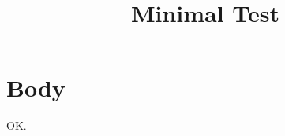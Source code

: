 \documentclass{SUSTechHomework}
\title{Minimal Test}
\begin{document}
\maketitle
\section{Body}
OK.
\end{document}
